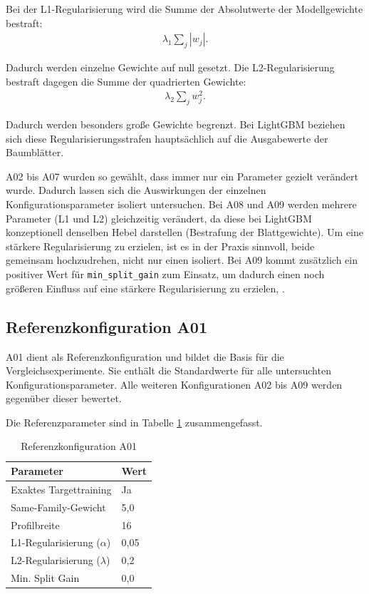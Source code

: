Bei der L1-Regularisierung wird die Summe der Absolutwerte der Modellgewichte bestraft:
\begin{align}
  \lambda_1 \sum_j |w_j|.
\end{align}

Dadurch werden einzelne Gewichte auf null gesetzt. 
Die L2-Regularisierung bestraft dagegen die Summe der quadrierten Gewichte:
\begin{align}
  \lambda_2 \sum_j w_j^2.
\end{align}

Dadurch werden besonders große Gewichte begrenzt. Bei LightGBM beziehen sich diese Regularisierungsstrafen hauptsächlich auf die Ausgabewerte der Baumblätter.

A02 bis A07 wurden so gewählt, dass immer nur ein Parameter gezielt verändert wurde. Dadurch lassen sich die Auswirkungen der einzelnen Konfigurationsparameter isoliert untersuchen.
Bei A08 und A09 werden mehrere Parameter (L1 und L2) gleichzeitig verändert, da diese bei LightGBM konzeptionell denselben Hebel darstellen (Bestrafung der Blattgewichte). 
Um eine stärkere Regularisierung zu erzielen, ist es in der Praxis sinnvoll, beide gemeinsam hochzudrehen, nicht nur einen isoliert.
Bei A09 kommt zusätzlich ein positiver Wert für \texttt{min\_split\_gain} zum Einsatz, um dadurch einen noch größeren Einfluss auf eine stärkere Regularisierung zu erzielen, \parencite{LTR_Configuration_Test_Series}.

\subsection{Referenzkonfiguration A01}

A01 dient als Referenzkonfiguration und bildet die Basis für die Vergleichsexperimente. Sie enthält die Standardwerte für alle untersuchten Konfigurationsparameter.
Alle weiteren Konfigurationen A02 bis A09 werden gegenüber dieser bewertet.

Die Referenzparameter sind in Tabelle \ref{tab:a01_referenz} zusammengefasst.

\begin{table}[H] 
    \centering 
    \caption{Referenzkonfiguration A01} 
    \label{tab:a01_referenz} 
    \begin{tabular}{ll} 
        \toprule 
        \textbf{Parameter} & \textbf{Wert} \\ 
        \midrule 
        Exaktes Targettraining & Ja \\ 
        Same-Family-Gewicht & 5,0 \\ 
        Profilbreite & 16 \\ 
        L1-Regularisierung ($\alpha$) & 0,05 \\ 
        L2-Regularisierung ($\lambda$) & 0,2 \\ 
        Min. Split Gain & 0,0 \\ 
        \bottomrule 
    \end{tabular} 
\end{table}

